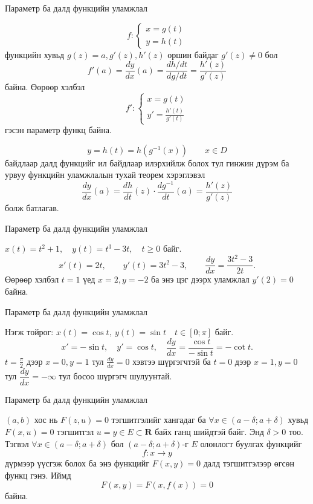 \begin{frame}[allowframebreaks]{Параметр ба далд функцийн уламжлал}
\begin{theorem} 
$$ f:
 \begin{cases}
     x=g(t)\\
     y=h(t)
 \end{cases}$$ функцийн хувьд 
$g(z)=a, g'(z), h'(z)$ оршин байдаг $g'(z)\neq 0$ бол 
\[
f'(a)=\frac{dy}{dx}(a)=\frac{dh/dt}{dg/dt}=\frac{h'(z)}{g'(z)}
\] байна.
Өөрөөр хэлбэл 
$$ f':
 \begin{cases}
     x=g(t)\\
     y'=\frac{h'(t)}{g'(t)}
 \end{cases}$$ гэсэн параметр функц байна.
\end{theorem}

\begin{prof} $$y=h(t)=h(g^{-1}(x))\qquad x\in D$$ байдлаар далд функцийг ил байдлаар илэрхийлж болох тул гинжин дүрэм ба урвуу функцийн уламжлалын тухай теорем хэрэглэвэл 
$$\dfrac{dy}{dx}(a)=\dfrac{dh}{dt}(z)\cdot \dfrac{dg^{-1}}{dt}(a)=\dfrac{h'(z)}{g'(z)}$$ болж батлагав.
\end{prof}
\end{frame}

\begin{frame}[allowframebreaks]{Параметр ба далд функцийн уламжлал}
\begin{example}
$x(t)=t^2+1,\quad y(t)=t^3-3t ,\quad t\geq 0$ байг. 
\[
x'(t)=2t,\qquad y'(t)=3t^2-3,\qquad
\frac{dy}{dx}=\frac{3t^2-3}{2t}.
\] Өөрөөр хэлбэл $t=1$ үед $x=2, y=-2$ ба энэ цэг дээрх уламжлал $y'(2)=0$ байна.  
\end{example}
\end{frame}

\begin{frame}[allowframebreaks]{Параметр ба далд функцийн уламжлал}
\begin{example}
Нэгж тойрог: $x(t)=\cos t,\ y(t)=\sin t \quad t\in [0;\pi]$ байг.
\[
x'=-\sin t,\quad y'=\cos t,\quad
\frac{dy}{dx}=\frac{\cos t}{-\sin t}=-\cot t.
\]
$t=\frac{\pi}{2}$ дээр $x=0, y=1$ тул $\frac{dy}{dx}=0$ хэвтээ шүргэгчтэй ба $t=0$ дээр $x=1,y=0$ тул $\dfrac{dy}{dx}=-\infty$ тул босоо шүргэгч шулуунтай.
\end{example}
\end{frame}

\begin{frame}[allowframebreaks]{Параметр ба далд функцийн уламжлал}
\begin{definition}  $(a,b)$ хос нь 
$F(z,u)=0$ тэгшитгэлийг хангадаг ба $\forall x\in (a-\delta;a+\delta)$ хувьд $F(x,u)=0$ тэгшитгэл $u=y\in E\subset\mathbf{R}$ байх ганц шийдтэй байг. Энд $\delta>0$ тоо. Тэгвэл  $\forall x\in (a-\delta;a+\delta)$ бол $(a-\delta;a+\delta)$-г $E$ олонлогт буулгах функцийг $$f: x\to y$$ дүрмээр үүсгэж болох ба энэ функцийг $F(x,y)=0$ далд тэгшитгэлээр өгсөн функц гэнэ. Иймд $$F(x,y)=F(x,f(x))=0$$ байна. 
\end{definition}
\end{frame}


